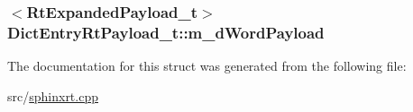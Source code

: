 \hypertarget{structDictEntryRtPayload__t_aed747b065a0096ab58249cb9cd7b4e53}{
\subsubsection[{m\-\_\-d\-Word\-Payload}]{$<${\bf Rt\-Expanded\-Payload\-\_\-t}$>$ Dict\-Entry\-Rt\-Payload\-\_\-t\-::m\-\_\-d\-Word\-Payload}}\label{structDictEntryRtPayload__t_aed747b065a0096ab58249cb9cd7b4e53}


The documentation for this struct was generated from the following file\-:\begin{DoxyCompactItemize}
\item 
src/\hyperlink{sphinxrt_8cpp}{sphinxrt.\-cpp}\end{DoxyCompactItemize}
